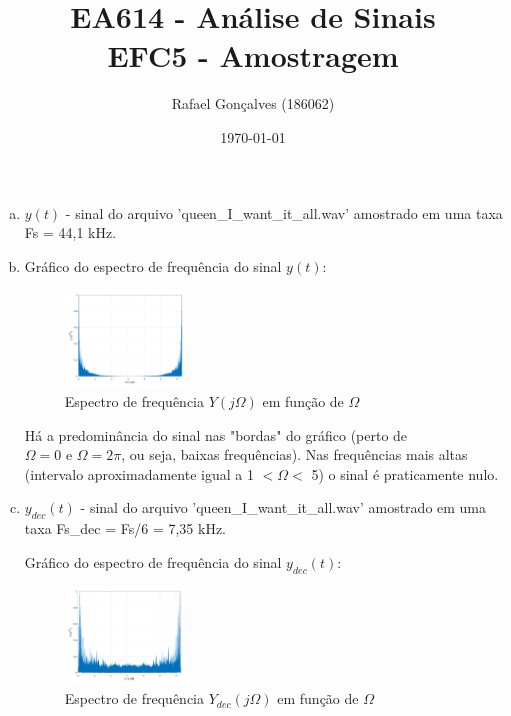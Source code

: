 \documentclass{article}
\begin{document}
\title{EA614 - Análise de Sinais \\
\large{EFC5 - Amostragem}}
\author{Rafael Gonçalves (186062)}
\date{\today}

\maketitle

\begin{enumerate}[(a)]
\item
    $y(t)$ - sinal do arquivo 'queen\_I\_want\_it\_all.wav' amostrado em uma taxa Fs = 44,1 kHz.

\item
    Gráfico do espectro de frequência do sinal $y(t)$:
    \begin{figure}[H]
    \centering
    \includegraphics[width=0.3\textwidth]{images/spectre.png}
        \caption{Espectro de frequência $Y(j\Omega)$ em função de $\Omega$}
    \end{figure}

        Há a predominância do sinal nas "bordas" do gráfico (perto de $\Omega = 0 \text{ e } \Omega = 2\pi$, ou seja, baixas frequências). Nas frequências mais altas (intervalo aproximadamente igual a 1 $< \Omega <$ 5) o sinal é praticamente nulo. 

\item
    $y_{dec}(t)$ - sinal do arquivo 'queen\_I\_want\_it\_all.wav' amostrado em uma taxa Fs\_dec = Fs/6 = 7,35 kHz.

    Gráfico do espectro de frequência do sinal $y_{dec}(t)$:
    \begin{figure}[H]
    \centering
    \includegraphics[width=0.3\textwidth]{images/spectre_dec.png}
        \caption{Espectro de frequência $Y_{dec}(j\Omega)$ em função de $\Omega$}
    \end{figure}


\end{enumerate}
\end{document}
